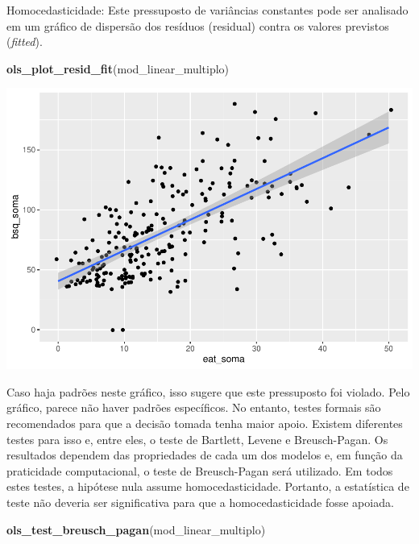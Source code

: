 \documentclass[
]{book}
\newenvironment{Shaded}{\begin{snugshade}}{\end{snugshade}}
\newcommand{\KeywordTok}[1]{\textcolor[rgb]{0.13,0.29,0.53}{\textbf{#1}}}
\newcommand{\NormalTok}[1]{#1}
\begin{document}
Homocedasticidade: Este pressuposto de variâncias constantes pode ser analisado em um gráfico de dispersão dos resíduos (residual) contra os valores previstos (\emph{fitted}).

\begin{Shaded}
\begin{Highlighting}[]
\KeywordTok{ols_plot_resid_fit}\NormalTok{(mod_linear_multiplo)}
\end{Highlighting}
\end{Shaded}

\begin{center}\includegraphics{gitbook-demo_files/figure-latex/unnamed-chunk-102-1} \end{center}

Caso haja padrões neste gráfico, isso sugere que este pressuposto foi violado. Pelo gráfico, parece não haver padrões específicos. No entanto, testes formais são recomendados para que a decisão tomada tenha maior apoio. Existem diferentes testes para isso e, entre eles, o teste de Bartlett, Levene e Breusch-Pagan. Os resultados dependem das propriedades de cada um dos modelos e, em função da praticidade computacional, o teste de Breusch-Pagan será utilizado. Em todos estes testes, a hipótese nula assume homocedasticidade. Portanto, a estatística de teste não deveria ser significativa para que a homocedasticidade fosse apoiada.

\begin{Shaded}
\begin{Highlighting}[]
\KeywordTok{ols_test_breusch_pagan}\NormalTok{(mod_linear_multiplo)}
\end{Highlighting}
\end{Shaded}
\end{document}
